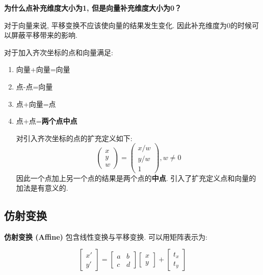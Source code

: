 \documentclass[openany]{progbookcn}
\begin{document}
\begin{question}
	\textbf{为什么点补充维度大小为1, 但是向量补充维度大小为0？}
	
	对于向量来说, 平移变换不应该使向量的结果发生变化. 因此补充维度为0的时候可以屏蔽平移带来的影响. 
	
	对于加入齐次坐标的点和向量满足: 
	\begin{enumerate}
		\item 向量+向量=向量
		\item 点-点=向量
		\item 点+向量=点
		\item 点+点=\textbf{两个点中点}
		
			对引入齐次坐标的点的扩充定义如下: 
			\begin{equation}
				\begin{pmatrix}x\\y\\w\end{pmatrix}=\begin{pmatrix}x/w\\y/w\\1\end{pmatrix},w\ne 0
			\end{equation}
			因此一个点加上另一个点的结果是两个点的\textbf{中点}. 引入了扩充定义点和向量的加法是有意义的. 
	\end{enumerate}
\end{question}

\subsection{仿射变换}

\textbf{仿射变换 (Affine) }包含线性变换与平移变换. 可以用矩阵表示为: 

\begin{equation}
	\begin{bmatrix}x'\\y'\end{bmatrix}=\begin{bmatrix}a&b\\c&d\end{bmatrix}\begin{bmatrix}x\\y\end{bmatrix}+\begin{bmatrix}t_x\\t_y\end{bmatrix}
\end{equation}
\end{document}
